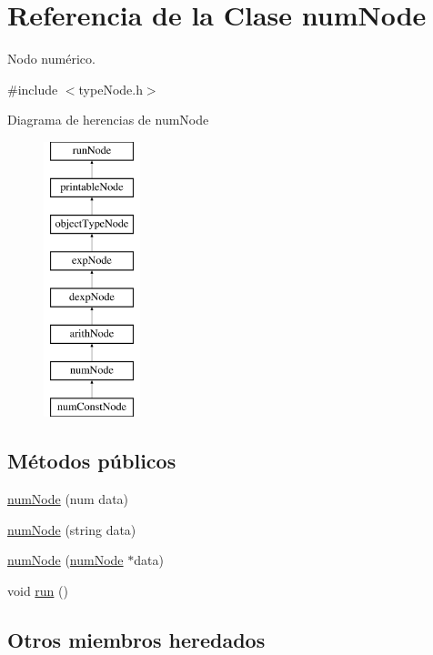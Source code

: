 \hypertarget{classnumNode}{\section{Referencia de la Clase num\-Node}
\label{classnumNode}
}


Nodo numérico.  




{\ttfamily \#include $<$type\-Node.\-h$>$}

Diagrama de herencias de num\-Node\begin{figure}[H]
\begin{center}
\leavevmode
\includegraphics[height=8.000000cm]{classnumNode}
\end{center}
\end{figure}
\subsection*{Métodos públicos}
\begin{DoxyCompactItemize}
\item 
\hyperlink{classnumNode_ade0b564b8b9b95ed2a269ff25c23536c}{num\-Node} (num data)
\item 
\hyperlink{classnumNode_ae1932d610b2d50c7f3d9ba2a79b012a8}{num\-Node} (string data)
\item 
\hyperlink{classnumNode_a31951adec25719df1503263ec7d46645}{num\-Node} (\hyperlink{classnumNode}{num\-Node} $\ast$data)
\item 
void \hyperlink{classnumNode_a631d65e358f2103268827f6274d381c2}{run} ()
\end{DoxyCompactItemize}
\subsection*{Otros miembros heredados}


